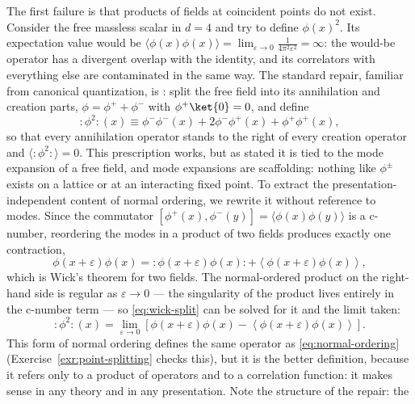 The first failure is that products of fields at coincident points do not
exist. Consider the free massless scalar in $d = 4$ and try to define
$\phi(x)^2$. Its expectation value would be $\langle \phi(x)\phi(x)\rangle =
\lim_{\varepsilon\to0} \frac{1}{4\pi^2 \varepsilon^2} = \infty$: the would-be
operator has a divergent overlap with the identity, and its correlators with
everything else are contaminated in the same way. The standard repair,
familiar from canonical quantization, is : split the
free field into its annihilation and creation parts, $\phi = \phi^+ +
\phi^-$ with $\phi^+\ket{0} = 0$, and define
\begin{equation}
{:}\phi^2{:}(x) \equiv \phi^-\phi^-(x) + 2\phi^-\phi^+(x)
+ \phi^+\phi^+(x),
\label{eq:normal-ordering}
\end{equation}
so that every annihilation operator stands to the right of every creation
operator and $\langle{:}\phi^2{:}\rangle = 0$. This prescription works,
but as stated it is tied to the mode expansion of a free field, and mode
expansions are scaffolding: nothing like $\phi^\pm$ exists on a lattice or at
an interacting fixed point. To extract the presentation-independent content
of normal ordering, we rewrite it without reference to modes. Since the
commutator $[\phi^+(x), \phi^-(y)] = \langle\phi(x)\phi(y)\rangle$ is a
c-number, reordering the modes in a product of two fields produces exactly
one contraction,
\begin{equation}
\phi(x + \varepsilon)\phi(x) =
{:}\phi(x+\varepsilon)\phi(x){:} +
\left\langle \phi(x+\varepsilon)\phi(x)\right\rangle ,
\label{eq:wick-split}
\end{equation}
which is Wick's theorem for two fields. The normal-ordered product on the
right-hand side is regular as $\varepsilon \to 0$ --- the singularity of the
product lives entirely in the c-number term --- so \eqref{eq:wick-split} can
be solved for it and the limit taken:
\begin{equation}
{:}\phi^2{:}(x) = \lim_{\varepsilon \to 0}
\left[ \phi(x + \varepsilon)\phi(x) -
\left\langle \phi(x+\varepsilon)\phi(x)\right\rangle \right].
\label{eq:point-splitting}
\end{equation}
This  form of normal ordering defines the same
operator as \eqref{eq:normal-ordering} (Exercise~\ref{exr:point-splitting}
checks this), but it is the better definition, because it refers only to a
product of operators and to a correlation function: it makes sense in any
theory and in any presentation. Note the structure of the repair: the
